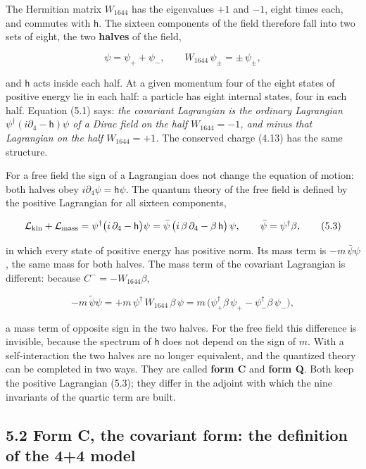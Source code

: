 \documentclass[
  10pt,
]{article}
\begin{document}
The Hermitian matrix \(W_{1644}\) has the eigenvalues \(+1\) and \(-1\),
eight times each, and commutes with \(\mathsf h\). The sixteen
components of the field therefore fall into two sets of eight, the two
\textbf{halves} of the field,

\[\psi=\psi_++\psi_-,\qquad W_{1644}\,\psi_\pm=\pm\,\psi_\pm,\tag{5.2}\]

and \(\mathsf h\) acts inside each half. At a given momentum four of the
eight states of positive energy lie in each half: a particle has eight
internal states, four in each half. Equation (5.1) says: \emph{the
covariant Lagrangian is the ordinary Lagrangian
\(\psi^\dagger(i\partial_4-\mathsf h)\psi\) of a Dirac field on the half
\(W_{1644}=-1\), and minus that Lagrangian on the half \(W_{1644}=+1\).}
The conserved charge (4.13) has the same structure.

For a free field the sign of a Lagrangian does not change the equation
of motion: both halves obey \(i\partial_4\psi=\mathsf h\psi\). The
quantum theory of the free field is defined by the positive Lagrangian
for all sixteen components,

\[\mathcal L_{\rm kin}+\mathcal L_{\rm mass}=\psi^\dagger\big(i\,\partial_4-\mathsf h\big)\psi
=\bar\psi\,\big(i\,\beta\,\partial_4-\beta\,\mathsf h\big)\,\psi,\qquad\bar\psi=\psi^\dagger\beta,\tag{5.3}\]

in which every state of positive energy has positive norm. Its mass term
is \(-m\,\bar\psi\psi\), the same mass for both halves. The mass term of
the covariant Lagrangian is different: because \(C^-=-W_{1644}\beta\),

\[-m\,\tilde\psi\psi=+m\,\psi^\dagger\,W_{1644}\,\beta\,\psi=m\,\big(\psi_+^\dagger\beta\,\psi_+-\psi_-^\dagger\beta\,\psi_-\big),\tag{5.4}\]

a mass term of opposite sign in the two halves. For the free field this
difference is invisible, because the spectrum of \(\mathsf h\) does not
depend on the sign of \(m\). With a self-interaction the two halves are
no longer equivalent, and the quantized theory can be completed in two
ways. They are called \textbf{form C} and \textbf{form Q}. Both keep the
positive Lagrangian (5.3); they differ in the adjoint with which the
nine invariants of the quartic term are built.

\hypertarget{form-c-the-covariant-form-the-definition-of-the-44-model}{%
\subsection{5.2 Form C, the covariant form: the definition of the 4+4
model}\label{form-c-the-covariant-form-the-definition-of-the-44-model}}
\end{document}
